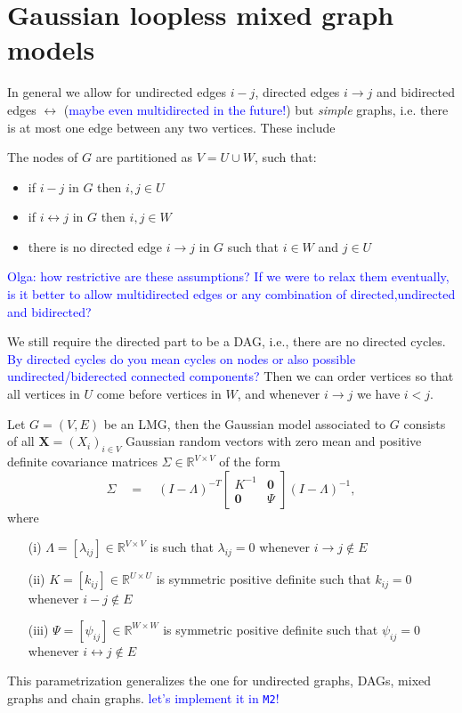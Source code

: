 \documentclass[10pt,a4paper]{article}
\newcommand{\RR}{\mathbb{R}}
\newcommand{\bs}{\boldsymbol}
\begin{document}
\newpage 
\section{Gaussian loopless mixed graph models}

In general we allow for undirected edges $i-j$, directed edges $i\to j$ and bidirected edges $\leftrightarrow$ (\textcolor{blue}{maybe even multidirected in the future!}) but \textit{simple} graphs, i.e. there is at most one edge between any two vertices. These include 

The nodes of $G$ are partitioned as $V = U\cup W$, such that:
\begin{itemize}
\item if $i-j$ in $G$ then $i,j\in U$
\item if $i\leftrightarrow j$ in $G$ then $i,j\in W$ 
\item there is no directed edge $i\to j$ in $G$ such that $i\in W$ and $j\in U$
\end{itemize}

\textcolor{blue}{Olga: how restrictive are these assumptions? If we were to relax them eventually, is it better to allow multidirected edges or any combination of directed,undirected and bidirected?}

 We still require the directed part to be a DAG, i.e., there are no directed cycles. \textcolor{blue}{By directed cycles do you mean cycles on nodes or also possible undirected/biderected connected components?} Then we can order vertices so that all vertices in $U$ come before vertices in $W$, and whenever $i\to j$ we have $i<j$. 

Let $G=(V,E)$ be an LMG, then the Gaussian model associated to $G$ consists of all $\bs X=(X_i)_{i\in V}$ Gaussian random vectors with zero mean and positive definite covariance matrices $\Sigma \in \RR^{V \times V}$ of the form
 \begin{equation}\label{eq:parametrization}
\Sigma\quad=\quad (I-\Lambda)^{-T}\left[\begin{array}{cc}
K^{-1} & \bs 0\\
\bs 0 & \Psi
\end{array}
\right](I-\Lambda)^{-1},
\end{equation}
where 
\begin{itemize}
\item[(i)] $\Lambda=[\lambda_{ij}]\in \RR^{V\times V}$ is such that $\lambda_{ij}=0$ whenever $i\to j \notin E$
\item[(ii)] $K=[k_{ij}] \in \RR^{U\times U}$ is symmetric positive definite such that $k_{ij}=0$ whenever $i-j\notin E$
\item[(iii)] $\Psi =[\psi_{ij}]\in \RR^{W\times W}$ is symmetric positive definite such that  $\psi_{ij}=0$ whenever $i\leftrightarrow j\notin E$
\end{itemize}

This parametrization generalizes the one for undirected graphs, DAGs, mixed graphs and chain graphs. \textcolor{blue}{let's implement it in \texttt{M2}!}



\end{document}
